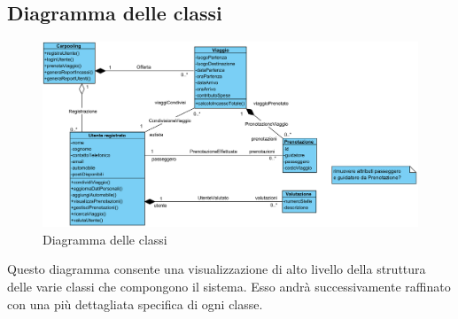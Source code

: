 \subsection{Diagramma delle classi}

\begin{figure}[H]
    \centering
    \includegraphics[scale=0.8]{img/diagrams/class_diagram.png}
    \caption{Diagramma delle classi}
\end{figure}

Questo diagramma consente una visualizzazione di alto livello della struttura delle varie classi che compongono il sistema. Esso andrà successivamente raffinato con una più dettagliata specifica di ogni classe.